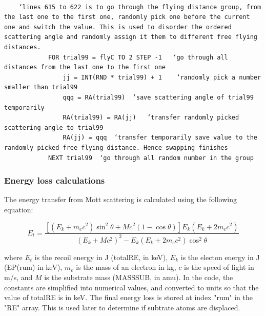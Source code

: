 \documentclass[10pt, reqno]{exam}
\begin{document}
\begin{verbatim}
    
    ‘lines 615 to 622 is to go through the flying distance group, from the last one to the first one, randomly pick one before the current one and switch the value. This is used to disorder the ordered scattering angle and randomly assign it them to different free flying distances. 
            FOR trial99 = flyC TO 2 STEP -1   ‘go through all distances from the last one to the first one
                jj = INT(RND * trial99) + 1    ‘randomly pick a number smaller than trial99
                qqq = RA(trial99)  ‘save scattering angle of trial99 temporarily 
                RA(trial99) = RA(jj)   ‘transfer randomly picked scattering angle to trial99
                RA(jj) = qqq  ‘transfer temporarily save value to the randomly picked free flying distance. Hence swapping finishes
            NEXT trial99  ‘go through all random number in the group
\end{verbatim}

\subsubsection{Energy loss calculations}

The energy transfer from Mott scattering is calculated using the following equation:

\begin{equation}
    E_t = \frac{[(E_k + m_ec^2) \sin^2\theta + Mc^2 (1 - \cos\theta)]E_k(E_k + 2m_ec^2)}{(E_k + Mc^2)^2 - E_k(E_k + 2m_ec^2)\cos^2\theta}
\end{equation}

where $E_t$ is the recoil energy in J (totalRE, in keV), $E_k$ is the electon energy in J (EP(rum) in keV), $m_e$ is the mass of an electron in kg, $c$ is the speed of light in \si{m/s}, and $M$ is the substrate mass (MASSSUB, in amu). In the code, the constants are simplified into numerical values, and converted to units so that the value of totalRE is in keV. The final energy loss is stored at index "rum" in the "RE" array. This is used later to determine if subtrate atoms are displaced. \par
\end{document}
